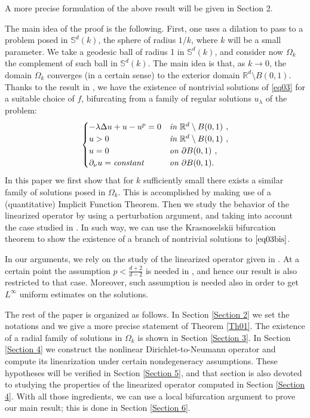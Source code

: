 \documentclass[reqno]{amsart}
\def\R{\mathbb R}
\numberwithin{equation}{section}
\newenvironment{key words}{\textbf{Keywords}\mbox{  }}{ }
\begin{document}
 A more precise formulation of the above result will be given in Section 2.

 \medskip

 The main idea of the proof is the following. First, one uses a dilation to pass to a problem posed in $\mathbb{S}^{d}(k)$, the sphere of radius $1/k$, where $k$ will be a small parameter. We take a geodesic ball of radius 1 in $\mathbb{S}^{d}(k)$, and consider now $\Omega_k$ the complement of such ball in $\mathbb{S}^{d}(k)$. The main idea is that, as $k\to 0$, the domain $\Omega_k$ converges (in a certain sense) to the exterior domain $\mathbb{R}^d \setminus B(0,1)$. Thanks to the result in \cite{RRS20}, we have the existence of nontrivial solutions of \eqref{eq03} for a suitable choice of $f$, bifurcating from a family of regular solutions $u_\lambda$ of the problem:
  \begin{gather}
 	\begin{cases}
 		-\lambda \Delta u +u-u^{p} =0&\emph{in $\R^{d} \setminus B(0,1)$ }, \\
 		 u >0&\emph{in $\mathbb{R}^{d}\setminus B(0,1)$ }, \\
 		u=0 &\emph{on $\partial B(0,1)$ },\\
 		\partial_{\nu} u=\emph{constant} &\emph{on $\partial B(0,1)$} .
 	\end{cases}
 \end{gather}
In this paper we first show that for $k$ sufficiently small there exists a similar family of solutions posed in $\Omega_k$. This is accomplished by making use of a (quantitative) Implicit Function Theorem. Then we study the behavior of the linearized operator by using a  perturbation argument, and taking into account the case studied in \cite{RRS20}. In such way, we can use the Krasnoselskii bifurcation theorem to show the existence of a branch of nontrivial solutions to $\eqref{eq03bis}$.

In our arguments, we rely on the study of the linearized operator given in \cite{RRS20}. At a certain point the assumption $p < \frac{d+2}{d-2}$ is needed in \cite{RRS20}, and hence our result is also restricted to that case. Moreover, such assumption is needed also in order to get $L^\infty$ uniform estimates on the solutions.



 \medskip

The rest of the paper is organized as follows. In Section \ref{Section 2} we set the notations and we give a more precise statement of Theorem \ref{Th01}. The existence of a radial family of solutions in $\Omega_k$ is shown in Section \ref{Section 3}. In Section \ref{Section 4} we construct the nonlinear Dirichlet-to-Neumann operator and compute its linearization under certain nondegeneracy assumptions. These hypotheses will be verified in Section \ref{Section 5}, and that section is also devoted to studying the properties of the linearized operator computed in Section \ref{Section 4}. With all those ingredients, we can use a local bifurcation argument to prove our main result; this is done in Section \ref{Section 6}.
\end{document}
